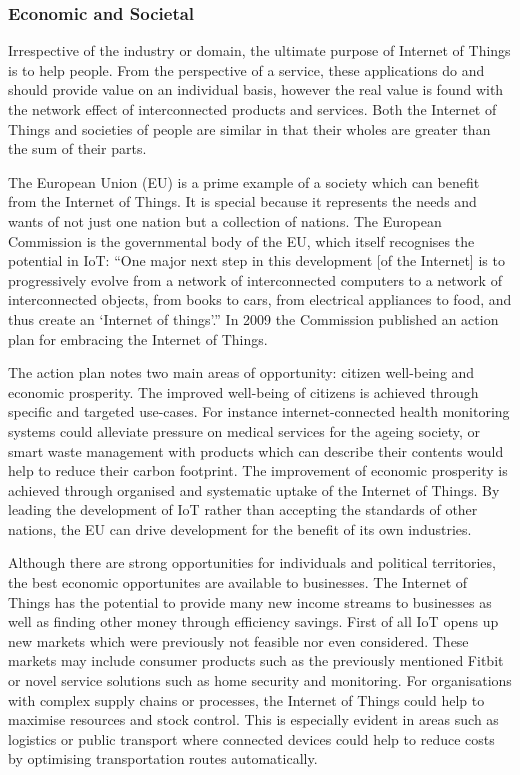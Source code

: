       \subsubsection{Economic and Societal}
        Irrespective of the industry or domain, the ultimate purpose of Internet of Things is to help people. From the perspective of a service, these applications do and should provide value on an individual basis, however the real value is found with the network effect of interconnected products and services. Both the Internet of Things and societies of people are similar in that their wholes are greater than the sum of their parts.

        The European Union (EU) is a prime example of a society which can benefit from the Internet of Things. It is special because it represents the needs and wants of not just one nation but a collection of nations. The European Commission is the governmental body of the EU, which itself recognises the potential in IoT: ``One major next step in this development [of the Internet] is to progressively evolve from a network of interconnected computers to a network of interconnected objects, from books to cars, from electrical appliances to food, and thus create an ‘Internet of things’.'' In 2009 the Commission published an action plan for embracing the Internet of Things.

        The action plan notes two main areas of opportunity: citizen well-being and economic prosperity. The improved well-being of citizens is achieved through specific and targeted use-cases. For instance internet-connected health monitoring systems could alleviate pressure on medical services for the ageing society, or smart waste management with products which can describe their contents would help to reduce their carbon footprint. The improvement of economic prosperity is achieved through organised and systematic uptake of the Internet of Things. By leading the development of IoT rather than accepting the standards of other nations, the EU can drive development for the benefit of its own industries.

        Although there are strong opportunities for individuals and political territories, the best economic opportunites are available to businesses. The Internet of Things has the potential to provide many new income streams to businesses as well as finding other money through efficiency savings. First of all IoT opens up new markets which were previously not feasible nor even considered. These markets may include consumer products such as the previously mentioned Fitbit or novel service solutions such as home security and monitoring. For organisations with complex supply chains or processes, the Internet of Things could help to maximise resources and stock control. This is especially evident in areas such as logistics or public transport where connected devices could help to reduce costs by optimising transportation routes automatically.

